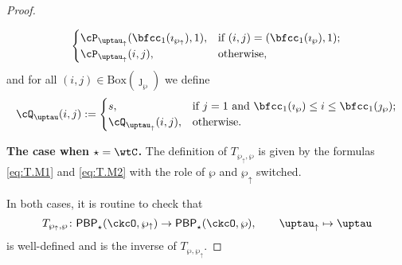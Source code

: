 \documentclass[12pt]{amsart}
\numberwithin{equation}{section}
\newtheorem{lem}[thm]{Lemma}
\theoremstyle{remark}
\def\BOX#1{\mathrm{Box}(#1)}
\def\CPPs{\mathrm{PP}_{\star}}
\def\PBP{\mathsf{PBP}}
\def\PBPop#1#2#3#4{\PBP_{#1}^{#2}(#3,#4)}
\newcommand{\PBPOP}[1][]{\PBPop{\star}{#1}{\ckcO}{\wp}}
\def\wpu{\wp_{\uparrow}}
\def\wpd{\wp} %
\def\uptauu{\uptau_{\uparrow}}
\def\uptaud{\uptau} %
\def\PPm{\wp_{\downarrow}}
\begin{document}
\begin{proof}
\begin{enumerate}[label=(\alph*)]
\begin{enumerate}[label={\localtextbulletone}]
\[\begin{cases}
         \cP_{\uptauu}(\bfcc_{1}(\imath_{\wpu}),1), & \text{if $(i,j)=(\bfcc_{1}(\imath_{\wpd}),1)$};\\
         \cP_{\uptauu}(i,j) ,&\text{otherwise},
       \end{cases}
     \]
     and for all $(i,j)\in \BOX{\jmath_{\wpd}}$  we define
     \[
       \cQ_{\uptaud}(i,j) := \begin{cases}
         s ,& \text{if $j=1$ and $\bfcc_{1}(\imath_{\wpd})\leq i \leq \bfcc_{1}(\jmath_{\wpd})$};\\
         \cQ_{\uptauu}(i,j) ,&\text{otherwise}.
       \end{cases}
     \]
   \end{enumerate}
 \end{enumerate}

\medskip

  {\bfseries The case when $\star = \wtC$.}
  The definition of $T_{\wpu,\wp}$ is given by the formulas \eqref{eq:T.M1} and
  \eqref{eq:T.M2} with the
  role of $\wp$ and $\wpu$ switched.


In both cases, it is routine to check that
  \[
    T_{\wpu,\wp}\colon
    \PBPop{\star}{}{\ckcO}{\wpu} \rightarrow \PBPOP  , \qquad \uptauu\mapsto \uptaud
  \]
 is well-defined and is the inverse of $T_{\wp,\wpu}$.
\end{proof}







\end{document}
